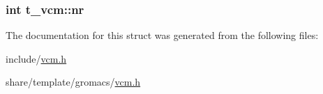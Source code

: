 \hypertarget{structt__vcm_a50e39889aad6dcc4070f87f02bc3e2ec}{
\subsubsection[{nr}]{\setlength{\rightskip}{0pt plus 5cm}int {\bf t\-\_\-vcm\-::nr}}}\label{structt__vcm_a50e39889aad6dcc4070f87f02bc3e2ec}


\-The documentation for this struct was generated from the following files\-:\begin{DoxyCompactItemize}
\item 
include/\hyperlink{include_2vcm_8h}{vcm.\-h}\item 
share/template/gromacs/\hyperlink{share_2template_2gromacs_2vcm_8h}{vcm.\-h}\end{DoxyCompactItemize}
